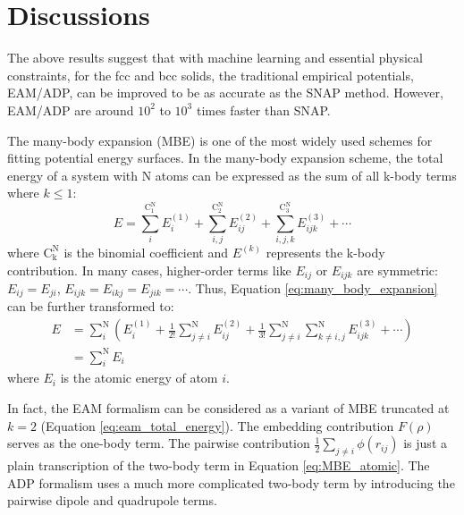 \documentclass[prb,reprint]{revtex4-2}
\begin{document}
% 
%
\section{Discussions}
\label{sec:discussions}

The above results suggest that with machine learning and essential physical 
constraints, for the fcc and bcc solids, the traditional empirical potentials, 
EAM/ADP, can be improved to be as accurate as the SNAP method. However, 
EAM/ADP are around $10^2$ to $10^3$ times faster than SNAP. 

The many-body expansion (MBE) is one of the most widely used schemes for fitting 
potential energy surfaces. In the many-body expansion scheme, the total energy 
of a system with N atoms can be expressed as the sum of all k-body terms where 
$k \le 1$:
\begin{equation}
\label{eq:many_body_expansion}
E = 
\sum_{i}^{\mathrm{C^N_1}}{E^{(1)}_{i}} +
\sum_{i,j}^{\mathrm{C^N_2}}{E^{(2)}_{ij}} + 
\sum_{i,j,k}^{\mathrm{C^N_3}}{E^{(3)}_{ijk}} + \cdots 
\end{equation}
where $\mathrm{C^N_k}$ is the binomial coefficient and $E^{(k)}$ represents the 
k-body contribution. In many cases, higher-order terms like $E_{ij}$ or 
$E_{ijk}$ are symmetric: $E_{ij}=E_{ji}$, $E_{ijk}=E_{ikj}=E_{jik}=\cdots$. 
Thus, Equation \ref{eq:many_body_expansion} can be further transformed to:
\begin{align}
\label{eq:MBE_atomic}
E & = \sum_{i}^{\mathrm{N}}{\left(
    E^{(1)}_{i} + 
    \frac{1}{2!}\sum_{j \ne i}^{\mathrm{N}}{E^{(2)}_{ij}} +
    \frac{1}{3!}\sum_{j \ne i}^{\mathrm{N}}{
        \sum_{k \ne i,j}^{\mathrm{N}}{E^{(3)}_{ijk}}
    } +
    \cdots
\right)} \nonumber \\
& = \sum_{i}^{\mathrm{N}}{E_{i}}
\end{align}
where $E_{i}$ is the atomic energy of atom $i$. 

In fact, the EAM formalism can be considered as a variant of MBE truncated at 
$k=2$ (Equation \ref{eq:eam_total_energy}). The embedding contribution $F(\rho)$ 
serves as the one-body term. The pairwise contribution 
$\frac{1}{2}\sum_{j\ne i}{\phi(r_{ij})}$ is just a plain transcription of the 
two-body term in Equation \ref{eq:MBE_atomic}. The ADP formalism uses a much 
more complicated two-body term by introducing the pairwise dipole and quadrupole 
terms. 
\end{document}
